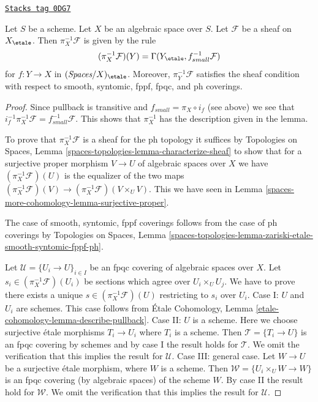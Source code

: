 \begin{lemma}
\label{spaces-more-cohomology-lemma-describe-pullback}
\href{https://stacks.math.columbia.edu/tag/0DG7}{\texttt{Stacks tag 0DG7}}

Let $S$ be a scheme. Let $X$ be an algebraic space over $S$.
Let $\mathcal{F}$ be a sheaf on $X_\etale$. Then
$\pi_X^{-1}\mathcal{F}$ is given by the rule
$$
(\pi_X^{-1}\mathcal{F})(Y) = \Gamma(Y_\etale, f_{small}^{-1}\mathcal{F})
$$
for $f : Y \to X$ in $(\textit{Spaces}/X)_\etale$.
Moreover, $\pi_Y^{-1}\mathcal{F}$ satisfies the
sheaf condition with respect to smooth, syntomic, fppf, fpqc, and ph coverings.
\end{lemma}

\begin{proof}
Since pullback is transitive and $f_{small} = \pi_X \circ i_f$
(see above) we see that
$i_f^{-1} \pi_X^{-1}\mathcal{F} = f_{small}^{-1}\mathcal{F}$.
This shows that $\pi_X^{-1}$ has the description given in the lemma.

\medskip\noindent
To prove that $\pi_X^{-1}\mathcal{F}$ is a sheaf for the ph topology
it suffices by Topologies on Spaces, Lemma
\ref{spaces-topologies-lemma-characterize-sheaf}
to show that for a surjective proper morphism
$V \to U$ of algebraic spaces over $X$ we have
$(\pi_X^{-1}\mathcal{F})(U)$ is the equalizer of the two maps
$(\pi_X^{-1}\mathcal{F})(V) \to (\pi_X^{-1}\mathcal{F})(V \times_U V)$.
This we have seen in Lemma \ref{spaces-more-cohomology-lemma-surjective-proper}.

\medskip\noindent
The case of smooth, syntomic, fppf coverings follows from the case
of ph coverings by Topologies on Spaces, Lemma
\ref{spaces-topologies-lemma-zariski-etale-smooth-syntomic-fppf-ph}.

\medskip\noindent
Let $\mathcal{U} = \{U_i \to U\}_{i \in I}$ be an fpqc covering of algebraic
spaces over $X$. Let $s_i \in (\pi_X^{-1}\mathcal{F})(U_i)$ be sections
which agree over $U_i \times_U U_j$. We have to prove there exists a unique
$s \in (\pi_X^{-1}\mathcal{F})(U)$ restricting to $s_i$ over $U_i$.
Case I: $U$ and $U_i$ are schemes. This case follows from
\'Etale Cohomology, Lemma \ref{etale-cohomology-lemma-describe-pullback}.
Case II: $U$ is a scheme. Here we choose surjective \'etale morphisms
$T_i \to U_i$ where $T_i$ is a scheme. Then $\mathcal{T} = \{T_i \to U\}$ is an
fpqc covering by schemes and by case I the result holds for $\mathcal{T}$.
We omit the verification that this implies the result for $\mathcal{U}$.
Case III: general case. Let $W \to U$ be a surjective \'etale
morphism, where $W$ is a scheme. Then $\mathcal{W} = \{U_i \times_U W \to W\}$
is an fpqc covering (by algebraic spaces) of the scheme $W$.
By case II the result hold for $\mathcal{W}$.
We omit the verification that this implies the result for $\mathcal{U}$.
\end{proof}

